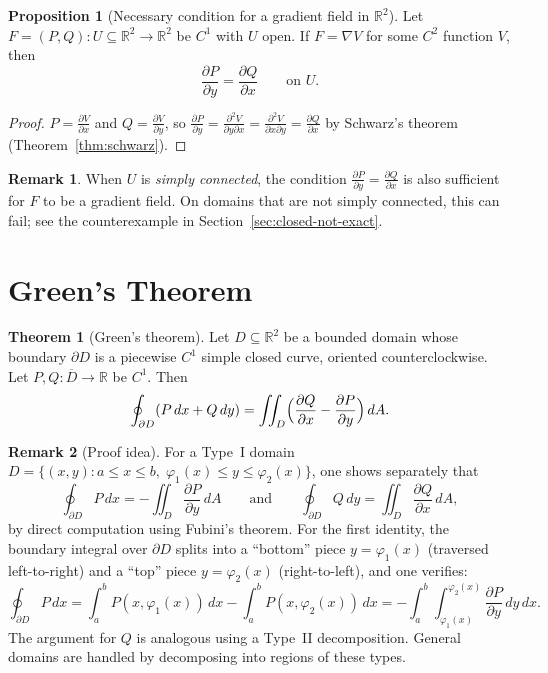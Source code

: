 \documentclass[12pt,a4paper]{book}
\theoremstyle{definition}
\newtheorem{theorem}{Theorem}[chapter]
\newtheorem{proposition}{Proposition}[chapter]
\newtheorem{remark}{Remark}[chapter]
\begin{document}
\begin{proposition}[Necessary condition for a gradient field in $\mathbb{R}^2$]
\label{prop:necessary-gradient}
Let $F=(P,Q)\colon U\subseteq\mathbb{R}^2\to\mathbb{R}^2$ be $C^1$ with $U$
open.  If $F=\nabla V$ for some $C^2$ function $V$, then
\[
  \frac{\partial P}{\partial y}=\frac{\partial Q}{\partial x}
  \qquad\text{on } U.
\]
\end{proposition}

\begin{proof}
$P=\frac{\partial V}{\partial x}$ and $Q=\frac{\partial V}{\partial y}$, so
$\frac{\partial P}{\partial y}=\frac{\partial^2 V}{\partial y\partial x}
=\frac{\partial^2 V}{\partial x\partial y}=\frac{\partial Q}{\partial x}$
by Schwarz's theorem (Theorem~\ref{thm:schwarz}).
\end{proof}

\begin{remark}
When $U$ is \emph{simply connected}, the condition
$\frac{\partial P}{\partial y}=\frac{\partial Q}{\partial x}$ is also
sufficient for $F$ to be a gradient field.  On domains that are not simply
connected, this can fail; see the counterexample in
Section~\ref{sec:closed-not-exact}.
\end{remark}

\section{Green's Theorem}
\label{sec:greens-theorem}

\begin{theorem}[Green's theorem]
\label{thm:green}
Let $D\subseteq\mathbb{R}^2$ be a bounded domain whose boundary $\partial D$
is a piecewise $C^1$ simple closed curve, oriented counterclockwise.  Let
$P,Q\colon\overline{D}\to\mathbb{R}$ be $C^1$.  Then
\[
  \oint_{\partial D}(P\,dx+Q\,dy)
  = \iint_D\Bigl(\frac{\partial Q}{\partial x}
    -\frac{\partial P}{\partial y}\Bigr)\,dA.
\]
\end{theorem}

\begin{remark}[Proof idea]
For a Type~I domain $D=\{(x,y):a\le x\le b,\;\varphi_1(x)\le y\le\varphi_2(x)\}$,
one shows separately that
\[
  \oint_{\partial D}P\,dx = -\iint_D\frac{\partial P}{\partial y}\,dA
  \qquad\text{and}\qquad
  \oint_{\partial D}Q\,dy = \iint_D\frac{\partial Q}{\partial x}\,dA,
\]
by direct computation using Fubini's theorem.  For the first identity, the
boundary integral over $\partial D$ splits into a ``bottom'' piece
$y=\varphi_1(x)$ (traversed left-to-right) and a ``top'' piece
$y=\varphi_2(x)$ (right-to-left), and one verifies:
\[
  \oint_{\partial D}P\,dx
  = \int_a^b P(x,\varphi_1(x))\,dx - \int_a^b P(x,\varphi_2(x))\,dx
  = -\int_a^b\int_{\varphi_1(x)}^{\varphi_2(x)}
    \frac{\partial P}{\partial y}\,dy\,dx.
\]
The argument for $Q$ is analogous using a Type~II decomposition.  General
domains are handled by decomposing into regions of these types.
\end{remark}
\end{document}
